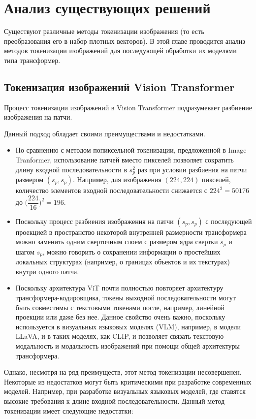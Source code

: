 \section{Анализ существующих решений}
Существуют различные методы токенизации изображения (то есть преобразования его в набор плотных векторов). В этой главе проводится анализ методов токенизации изображений для последующей обработки их моделями типа трансформер.

\subsection{Токенизация изображений Vision Transformer}
Процесс токенизации изображений в Vision Transformer подразумевает разбиение изображения на патчи.

Данный подход обладает своими преимуществами и недостатками.

\begin{itemize}
    \item По сравнению с методом попиксельной токенизации, предложенной в Image Tranformer, использование патчей вместо пикселей позволяет сократить длину входной последовательности в $s_p^2$ раз при условии разбиения на патчи размером $(s_p, s_p)$. Например, для изображения $(224, 224)$ пикселей, количество элементов входной последовательности снижается с $224^2 = 50 176$ до $ \Big(\dfrac{224}{16}\Big)^2 = 196$.
    \item Поскольку процесс разбиения изображения на патчи $(s_p, s_p)$ с последующей проекцией в пространство некоторой внутренней размерности трансформера можно заменить одним сверточным слоем с размером ядра свертки $s_p$ и шагом $s_p$, можно говорить о сохранении информации о простейших локальных структурах (например, о границах объектов и их текстурах) внутри одного патча.
    \item Поскольку архитектура ViT почти полностью повторяет архитектуру трансформера-кодировщика, токены выходной последовательности могут быть совместимы с текстовыми токенами после, например, линейной проекции или даже без нее. Данное свойство очень важно, поскольку используется в визуальных языковых моделях (VLM), например, в модели LLaVA\cite{llava}, и в таких моделях, как CLIP\cite{clip}, и позволяет связать текстовую модальность и модальность изображений при помощи общей архитектуры трансформера.
\end{itemize}

Однако, несмотря на ряд преимуществ, этот метод токенизации несовершенен. Некоторые из недостатков могут быть критическими при разработке современных моделей. Например, при разработке визуальных языковых моделей, где ставятся высокие требования к длине входной последовательности. Данный метод токенизации имеет следующие недостатки:

